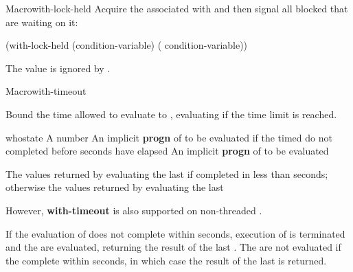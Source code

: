 \begin{functiondoc}{Macro}{with-lock-held}{\code{(} 
    \code{)}
    \superstar{} 
    \returns{} \superstar}
%
Acquire the  associated with  and then
signal all blocked  that are waiting on it:
\begin{example}
  (with-lock-held (condition-variable)
    ( condition-variable))
\end{example}

\fnnote The  value is ignored by
.

\end{functiondoc}


\begin{functiondoc}{Macro}{with-timeout}{\code{(} 
    \superstar{}\code{)}
    \superstar{} 
    \returns{} \superstar}
\fnsyntax

\fnpurpose Bound the time allowed to evaluate  to
, evaluating  if the time limit is reached.

\fnpackage {}

\fnmodule {}

\fnargs
\begin{args}{whostate}
\arg[seconds] A number
 An implicit \textbf{progn} of  to be
evaluated if the timed  do not completed before 
seconds have elapsed
\arg[forms] An implicit \textbf{progn} of  to be evaluated
\end{args}

\fnreturns The values returned by evaluating the last  if
completed in less than  seconds; otherwise the values returned by
evaluating the last 

\fnerrors \nothreads{} However, \textbf{with-timeout} is also
supported on non-threaded .

\fndescription If the evaluation of  does not complete within
 seconds, execution of  is terminated and the
 are evaluated, returning the result of the last
. The  are not evaluated if the
 complete within  seconds, in which case the result of the
last  is returned.


\end{functiondoc}
